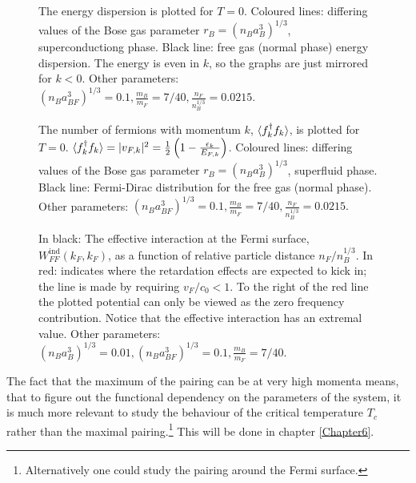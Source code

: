 \begin{figure} 
\begin{center}  
  
\caption{The energy dispersion is plotted for $T = 0$. Coloured lines: differing values of the Bose gas parameter $r_B = (n_Ba_B^3)^{1/3}$, superconductiong phase. Black line: free gas (normal phase) energy dispersion. The energy is even in $k$, so the graphs are just mirrored for $k < 0$. Other parameters: $(n_Ba_{BF}^3)^{1/3} = 0.1, \frac{m_B}{m_F} = 7/40, \frac{n_F}{n_B^{1/3}} = 0.0215.$ }  
\label{fig.EnergyDispersion}  
\end{center}    
\end{figure}


\begin{figure} 
\begin{center}  
  
\caption{The number of fermions with momentum $k$, $\braket{f_k^\dagger f_k}$, is plotted for $T = 0$. $\braket{f_k^\dagger f_k} = |v_{F,k}|^2 = \frac{1}{2}\left(1 - \frac{\epsilon_k}{E_{F,k}}\right)$. Coloured lines: differing values of the Bose gas parameter $r_B = (n_Ba_B^3)^{1/3}$, superfluid phase. Black line: Fermi-Dirac distribution for the free gas (normal phase). Other parameters: $(n_Ba_{BF}^3)^{1/3} = 0.1, \frac{m_B}{m_F} = 7/40, \frac{n_F}{n_B^{1/3}} = 0.0215.$  }  
\label{fig.Occupancy}  
\end{center}    
\end{figure}

\begin{figure} 
\begin{center}  
  
\caption{In black: The effective interaction at the Fermi surface, $W_{FF}^\text{ind}(k_F,k_F)$, as a function of relative particle distance $n_F/n_B^{1/3}$. In red: indicates where the retardation effects are expected to kick in; the line is made by requiring $v_F/c_0 < 1$. To the right of the red line the plotted potential can only be viewed as the zero frequency contribution. Notice that the effective interaction has an extremal value. Other parameters: $(n_Ba_B^3)^{1/3} = 0.01, (n_Ba_{BF}^3)^{1/3} = 0.1, \frac{m_B}{m_F} = 7/40.$}  
\label{fig.maxkDeltakaBdepend}  
\end{center}    
\end{figure}

The fact that the maximum of the pairing can be at very high momenta means, that to figure out the functional dependency on the parameters of the system, it is much more relevant to study the behaviour of the critical temperature $T_c$ rather than the maximal pairing.\footnote{Alternatively one could study the pairing around the Fermi surface.} This will be done in chapter \ref{Chapter6}.

